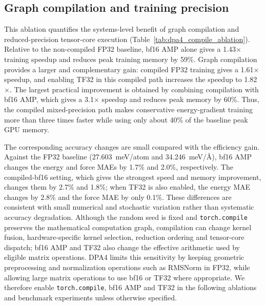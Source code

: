 \FloatBarrier

\subsection{Graph compilation and training precision}
\label{sec:sm-compile-ablation}

This ablation quantifies the systems-level benefit of graph compilation and reduced-precision tensor-core execution (Table~\ref{tab:dpa4_compile_ablation}).
Relative to the non-compiled FP32 baseline, bf16 AMP alone gives a 1.43$\times$ training speedup and reduces peak training memory by 59\%.
Graph compilation provides a larger and complementary gain: compiled FP32 training gives a 1.61$\times$ speedup, and enabling TF32 in this compiled path increases the speedup to 1.82$\times$.
The largest practical improvement is obtained by combining compilation with bf16 AMP, which gives a 3.1$\times$ speedup and reduces peak memory by 60\%.
Thus, the compiled mixed-precision path makes conservative energy-gradient training more than three times faster while using only about 40\% of the baseline peak GPU memory.

The corresponding accuracy changes are small compared with the efficiency gain.
Against the FP32 baseline (27.603~meV/atom and 34.246~meV/\AA{}), bf16 AMP changes the energy and force MAEs by 1.7\% and 2.0\%, respectively.
The compiled-bf16 setting, which gives the strongest speed and memory improvement, changes them by 2.7\% and 1.8\%; when TF32 is also enabled, the energy MAE changes by 2.8\% and the force MAE by only 0.1\%.
These differences are consistent with small numerical and stochastic variation rather than systematic accuracy degradation.
Although the random seed is fixed and \texttt{torch.compile} preserves the mathematical computation graph, compilation can change kernel fusion, hardware-specific kernel selection, reduction ordering and tensor-core dispatch; bf16 AMP and TF32 also change the effective arithmetic used by eligible matrix operations.
DPA4 limits this sensitivity by keeping geometric preprocessing and normalization operations such as RMSNorm in FP32, while allowing large matrix operations to use bf16 or TF32 where appropriate.
We therefore enable \texttt{torch.compile}, bf16 AMP and TF32 in the following ablations and benchmark experiments unless otherwise specified.

